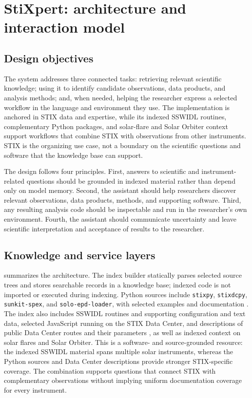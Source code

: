 \section{StiXpert: architecture and interaction model}
\label{sec:architecture}

\subsection{Design objectives}

The system addresses three connected tasks: retrieving relevant scientific knowledge;
using it to identify candidate observations, data products, and analysis methods; and,
when needed, helping the researcher express a selected workflow in the language and
environment they use.
The implementation is anchored in STIX data and expertise, while its indexed SSWIDL
routines, complementary Python packages, and solar-flare and Solar Orbiter context
support workflows that combine STIX with observations from other instruments.
STIX is the organizing use case, not a boundary on the scientific questions and
software that the knowledge base can support.

The design follows four principles.
First, answers to scientific and instrument-related questions should be grounded in
indexed material rather than depend only on model memory.
Second, the assistant should help researchers discover relevant observations, data
products, methods, and supporting software.
Third, any resulting analysis code should be inspectable and run in the researcher's own
environment.
Fourth, the assistant should communicate uncertainty and leave scientific
interpretation and acceptance of results to the researcher.

\subsection{Knowledge and service layers}

 summarizes the architecture.
The index builder statically parses selected source trees and stores searchable records
in a knowledge base; indexed code is not imported or executed during indexing.
Python sources include \texttt{stixpy}, \texttt{stixdcpy}, \texttt{sunkit-spex}, and
\texttt{solo-epd-loader}, with selected examples and documentation
\cite{stixpy2026,stixdcpy2022}.
The index also includes SSWIDL routines and supporting configuration and text data,
selected JavaScript running on the STIX Data Center, and descriptions of public Data Center
routes and their parameters \cite{xiao2023stixdc}, as well as indexed context on solar
flares and Solar Orbiter.
This is a software- and source-grounded resource: the indexed SSWIDL material spans
multiple solar instruments, whereas the Python sources and Data Center descriptions
provide stronger STIX-specific coverage.
The combination supports questions that connect STIX with complementary observations
without implying uniform documentation coverage for every instrument.

